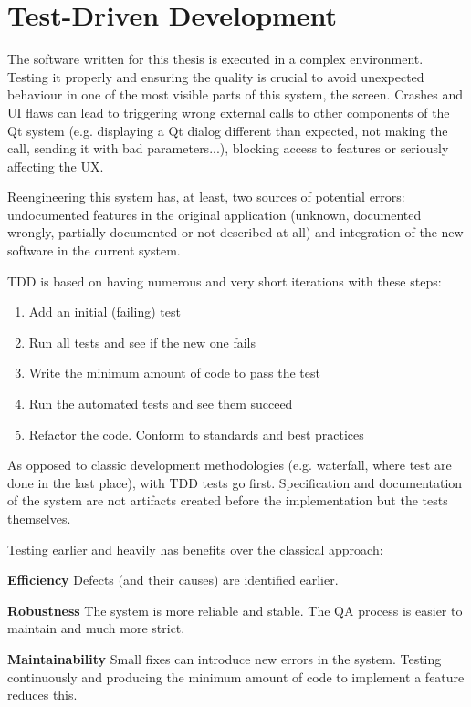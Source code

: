 \section{Test-Driven Development}
The software written for this thesis is executed in a complex environment.
Testing it properly and ensuring the quality is crucial to avoid unexpected behaviour in one of the most visible parts of this system, the screen.
Crashes and \ac{UI} flaws can lead to triggering wrong external calls to other components of the Qt system (e.g. displaying a Qt dialog different than expected, not making the call, sending it with bad parameters...), blocking access to features or seriously affecting the \ac{UX}.

Reengineering this system has, at least, two sources of potential errors: 
undocumented features in the original application (unknown, documented wrongly, partially documented or not described at all) and integration of the new software in the current system.

\ac{TDD} is based on having numerous and very short iterations with these steps:
\begin{enumerate}
    \item Add an initial (failing) test
    \item Run all tests and see if the new one fails
    \item Write the minimum amount of code to pass the test
    \item Run the automated tests and see them succeed
    \item Refactor the code. Conform to standards and best practices
\end{enumerate}

As opposed to classic development methodologies (e.g. waterfall, where test are done in the last place), with \ac{TDD} tests go first. 
Specification and documentation of the system are not artifacts created before the implementation but the tests themselves.

Testing earlier and heavily has benefits over the classical approach:

\textbf{Efficiency} Defects (and their causes) are identified earlier.

\textbf{Robustness} The system is more reliable and stable. 
The \ac{QA} process is easier to maintain and much more strict.

\textbf{Maintainability} Small fixes can introduce new errors in the system. 
Testing continuously and producing the minimum amount of code to implement a feature reduces this.

